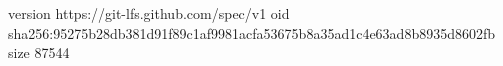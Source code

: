 version https://git-lfs.github.com/spec/v1
oid sha256:95275b28db381d91f89c1af9981acfa53675b8a35ad1c4e63ad8b8935d8602fb
size 87544
